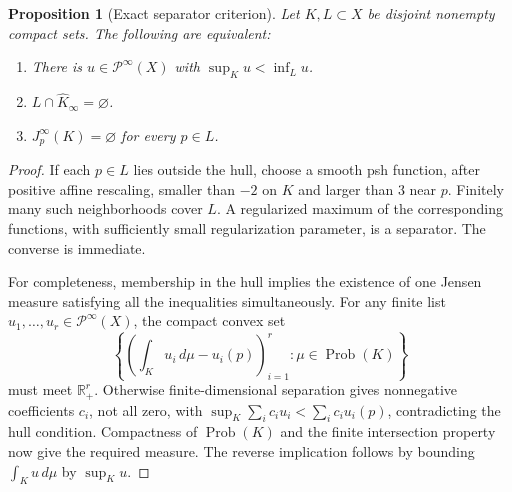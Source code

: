\documentclass[11pt]{article}
\newtheorem{proposition}[theorem]{Proposition}
\theoremstyle{remark}
\begin{document}
\begin{proposition}[Exact separator criterion]\label{prop:separator-criterion}
Let $K,L\subset X$ be disjoint nonempty compact sets. The following are
equivalent:
\begin{enumerate}
\item There is $u\in\mathcal P^\infty(X)$ with
$\sup_Ku<\inf_Lu$.
\item $L\cap\widehat K_\infty=\varnothing$.
\item $J_p^\infty(K)=\varnothing$ for every $p\in L$.
\end{enumerate}
\end{proposition}
\begin{proof}
If each $p\in L$ lies outside the hull, choose a smooth psh function,
after positive affine rescaling, smaller than $-2$ on $K$ and larger
than $3$ near $p$. Finitely many such neighborhoods cover $L$.
A regularized maximum of the corresponding functions, with sufficiently
small regularization parameter, is a separator. The converse is immediate.

For completeness, membership in the hull implies the existence of one
Jensen measure satisfying all the inequalities simultaneously. For any
finite list $u_1,\ldots,u_r\in\mathcal P^\infty(X)$, the compact convex set
\[
 \left\{\left(\int_Ku_i\,d\mu-u_i(p)\right)_{i=1}^r:
                   \mu\in\operatorname{Prob}(K)\right\}
\]
must meet $\mathbb R_+^r$. Otherwise finite-dimensional separation gives
nonnegative coefficients $c_i$, not all zero, with
$\sup_K\sum_i c_i u_i<\sum_i c_i u_i(p)$, contradicting the hull condition.
Compactness of $\operatorname{Prob}(K)$ and the finite intersection
property now give the required measure. The reverse implication follows
by bounding $\int_Ku\,d\mu$ by $\sup_Ku$.
\end{proof}
\end{document}
